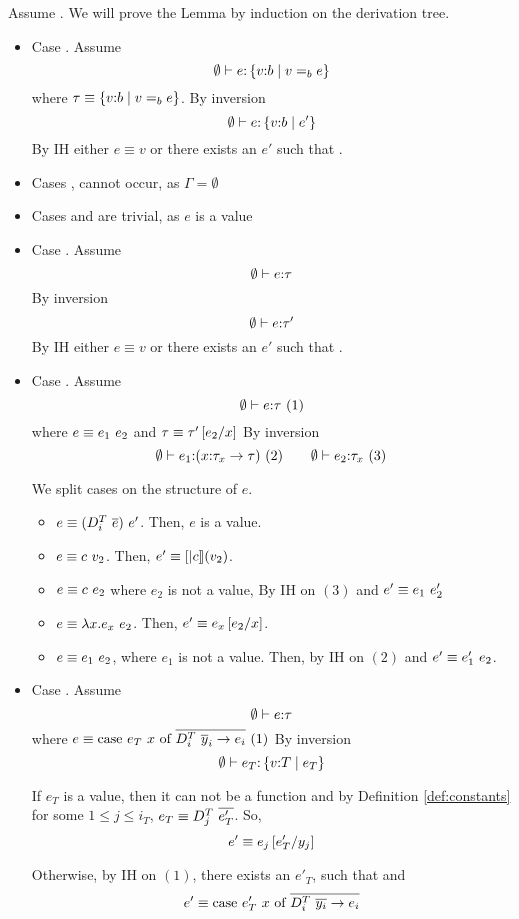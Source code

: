Assume .
We will prove the Lemma by induction on the derivation tree.
\begin{itemize}
\item Case \rtexact. Assume
$$	\hastype{\emptyset}{e}{\tref{v}{b}{v \eqb{b} e}}
$$
where $\tau\equiv\tref{v}{b}{v\eqb{b} e}$.
By inversion
$$	\hastype{\emptyset}{e}{\tref{v}{b}{e'}}$$
By IH 
either $e \equiv v$ or there exists an $e'$ such that .

\item Cases \rtvarbase, \rtvar cannot occur, as $\Gamma = \emptyset$
\item Cases \rtconst and \rtfun are trivial, 
		as $e$ is a value
\item Case \rtsub. Assume 
$$\hastype{\emptyset}{e}{\tau}$$
By inversion
$$	\hastype{\emptyset}{e}{\tau'}$$
By IH 
either $e \equiv v$ or there exists an $e'$ such that .
\item Case \rtapp. Assume 
$$\hastype{\emptyset}{e}{\tau}\ (1)$$
where $e\equiv\eapp{e_1}{e_2}$ and $\tau\equiv\tau'\sub{x}{e_2}$
By inversion
$$
	\hastype{\emptyset}{e_1}{(\tfun{x}{\tau_{x}}{\tau})}\ (2)\qquad
	\hastype{\emptyset}{e_2}{\tau_{x}}\ (3)
$$

We split cases on the structure of $e$.
\begin{itemize}
\item $e\equiv \eapp{(\eapp{\dcti}{\overline{e}})}{e'}$.
Then, $e$ is a value.

\item $e\equiv \eapp{c}{v_2}$.
Then, $e'\equiv\interp{c}(v_2)$.

\item $e\equiv \eapp{c}{e_2}$ where $e_2$ is not a value, 
By IH on $(3)$  and  $e' \equiv \eapp{e_1}{e_2'}$

\item $e \equiv \eapp{\efun{x}{e_x}}{e_2}$.
Then, $e' \equiv e_x\sub{x}{e_2}$.

\item $e \equiv \eapp{e_1}{e_2}$, where $e_1$ is not a value.
Then, by IH on $(2)$  and 
$e'\equiv\eapp{e_1'}{e_2}$.
\end{itemize}
\item Case \rtcase. Assume 
$$
	\hastype{\emptyset}{e}{\tau}
$$
where $e\equiv\ecase{e_T}{x}{\dcti}{\overline{y}_i}{e_i}\ (1)$
By inversion 
$$\hastype{\emptyset}{e_T}{\tref{v}{T}{e_T}}$$

If $e_T$ is a value, 
then it can not be a function and by Definition \ref{def:constants}
for some $1 \leq j \leq i_T$, $e_T \equiv \dct{j}\ \overline{e'_T}$.
So, $$e' \equiv e_j\sub{y_j}{e'_T}$$

Otherwise, by IH on $(1)$, there exists an $e'_T$, such that 
and $$e' \equiv \ecase{e'_T}{x}{\dcti}{\overline{y_i}}{e_i}$$
\end{itemize}